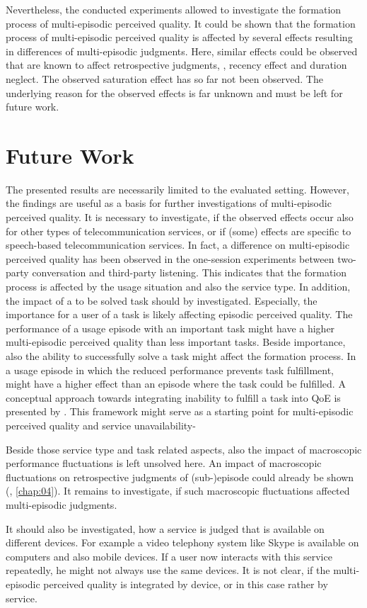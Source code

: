 Nevertheless, the conducted experiments allowed to investigate the formation process of multi-episodic perceived quality.
It could be shown that the formation process of multi-episodic perceived quality is affected by several effects resulting in differences of multi-episodic judgments.
Here, similar effects could be observed that are known to affect retrospective judgments, \ie, recency effect and duration neglect.
The observed saturation effect has so far not been observed.
The underlying reason for the observed effects is far unknown and must be left for future work.

\section{Future Work}
The presented results are necessarily limited to the evaluated setting.
However, the findings are useful as a basis for further investigations of multi-episodic perceived quality.
It is necessary to investigate, if the observed effects occur also for other types of telecommunication services, or if (some) effects are specific to speech-based telecommunication services.
In fact, a difference on multi-episodic perceived quality has been observed in the one-session experiments between two-party conversation and third-party listening.
This indicates that the formation process is affected by the usage situation and also the service type.
In addition, the impact of a to be solved task should by investigated.
Especially, the importance for a user of a task is likely affecting episodic perceived quality.
The performance of a usage episode with an important task might have a higher multi-episodic perceived quality than less important tasks.
Beside importance, also the ability to successfully solve a task might affect the formation process.
In a usage episode in which the reduced performance prevents task fulfillment, might have a higher effect than an episode where the task could be fulfilled.
A conceptual approach towards integrating inability to fulfill a task into \ac{QoE} is presented by \citet{leon-garcia_generalizing_2014}.
This framework might serve as a starting point for multi-episodic perceived quality and service unavailability-

Beside those service type and task related aspects, also the impact of macroscopic performance fluctuations is left unsolved here.
An impact of macroscopic fluctuations on retrospective judgments of (sub-)episode could already be shown (\cf, \autoref{chap:04}).
It remains to investigate, if such macroscopic fluctuations affected multi-episodic judgments.

It should also be investigated, how a service is judged that is available on different devices.
For example a video telephony system like Skype is available on computers and also mobile devices.
If a user now interacts with this service repeatedly, he might not always use the same devices.
It is not clear, if the multi-episodic perceived quality is integrated by device, or in this case rather by service.